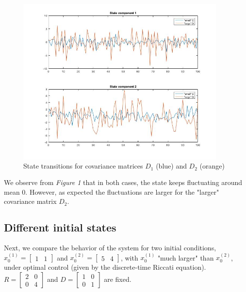 \documentclass[11pt, oneside]{article}   	%
\begin{document}
\begin{figure}[ht!]
\centering
\includegraphics[width=105mm]{../plots/ii.jpg}
\caption{State transitions for covariance matrices $D_1$ (blue) and $D_2$ (orange)}
\end{figure}

We observe from \textit{Figure 1} that in both cases, the state keeps fluctuating around mean 0. However, as expected the fluctuations are larger for the "larger" covariance matrix $D_2$.

\subsection{Different initial states}
Next, we compare the behavior of the system for two initial conditions, $x_0^{(1)} = \begin{bmatrix} 1 & 1 \end{bmatrix}$ and $x_0^{(2)} = \begin{bmatrix} 5 & 4 \end{bmatrix}$, with $x_0^{(1)}$ "much larger" than $x_0^{(2)}$, under optimal control (given by the discrete-time Riccati equation). $R = \begin{bmatrix} 2 & 0 \\[0.3em] 0 & 4 \end{bmatrix}$ and $D = \begin{bmatrix} 1 & 0 \\[0.3em] 0 & 1 \end{bmatrix}$ are fixed. \\
\end{document}
